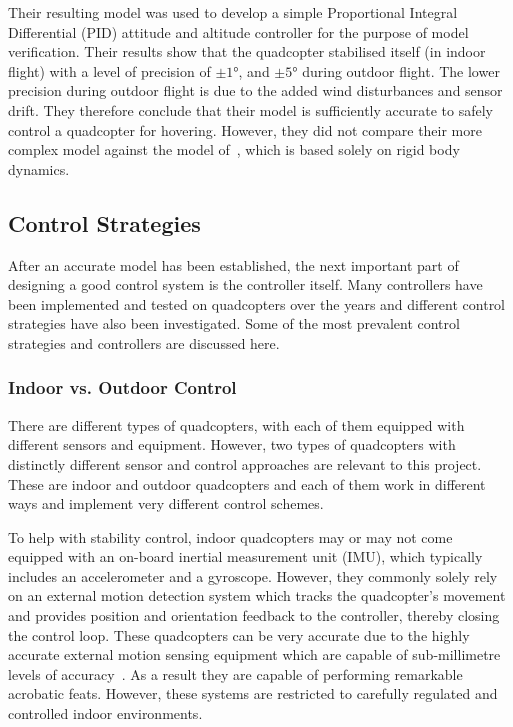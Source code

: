 Their resulting model was used to develop a simple Proportional Integral Differential (PID) attitude and altitude controller for the purpose of model verification. Their results show that the quadcopter stabilised itself (in indoor flight) with a level of precision of $\pm\ang{1}$, and $\pm\ang{5}$ during outdoor flight. The lower precision during outdoor flight is due to the added wind disturbances and sensor drift. They therefore conclude that their model is sufficiently accurate to safely control a quadcopter for hovering. However, they did not compare their more complex model against the model of~\citeauthor{hamel2002dynamic}, which is based solely on rigid body dynamics. 

\subsection{Control Strategies}

After an accurate model has been established, the next important part of designing a good control system is the controller itself. Many controllers have been implemented and tested on quadcopters over the years and different control strategies have also been investigated. Some of the most prevalent control strategies and controllers are discussed here.

\subsubsection{Indoor vs. Outdoor Control}

There are different types of quadcopters, with each of them equipped with different sensors and equipment. However, two types of quadcopters with distinctly different sensor and control approaches are relevant to this project. These are indoor and outdoor quadcopters and each of them work in different ways and implement very different control schemes. 

To help with stability control, indoor quadcopters may or may not come equipped with an on-board inertial measurement unit (IMU), which typically includes an accelerometer and a gyroscope. However, they commonly solely rely on an external motion detection system which tracks the quadcopter's movement and provides position and orientation feedback to the controller, thereby closing the control loop. These quadcopters can be very accurate due to the highly accurate external motion sensing equipment which are capable of sub-millimetre levels of accuracy~\citep{richards1999measurement}. As a result they are capable of performing remarkable acrobatic feats. However, these systems are restricted to carefully regulated and controlled indoor environments.

